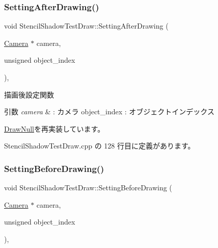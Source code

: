 \subsubsection{\texorpdfstring{Setting\+After\+Drawing()}{SettingAfterDrawing()}}
{\footnotesize\ttfamily void Stencil\+Shadow\+Test\+Draw\+::\+Setting\+After\+Drawing (\begin{DoxyParamCaption}\item[{\mbox{\hyperlink{class_camera}{Camera}} $\ast$}]{camera,  }\item[{unsigned}]{object\+\_\+index }\end{DoxyParamCaption})\hspace{0.3cm}{\ttfamily [override]}, {\ttfamily [virtual]}}



描画後設定関数 


\begin{DoxyParams}{引数}
{\em camera} & \+: カメラ object\+\_\+index \+: オブジェクトインデックス \\
\hline
\end{DoxyParams}


\mbox{\hyperlink{class_draw_null_a76edfc5af0bf3275f96f40394aff8510}{Draw\+Null}}を再実装しています。



 Stencil\+Shadow\+Test\+Draw.\+cpp の 128 行目に定義があります。

\mbox{\label{class_stencil_shadow_test_draw_a0f697b6dad67048c7f8916a53cca6b1c}} 
\subsubsection{\texorpdfstring{Setting\+Before\+Drawing()}{SettingBeforeDrawing()}}
{\footnotesize\ttfamily void Stencil\+Shadow\+Test\+Draw\+::\+Setting\+Before\+Drawing (\begin{DoxyParamCaption}\item[{\mbox{\hyperlink{class_camera}{Camera}} $\ast$}]{camera,  }\item[{unsigned}]{object\+\_\+index }\end{DoxyParamCaption})\hspace{0.3cm}{\ttfamily [override]}, {\ttfamily [virtual]}}



